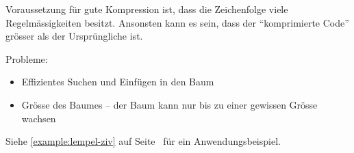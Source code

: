 Voraussetzung für gute Kompression ist, dass die Zeichenfolge viele
Regelmässigkeiten besitzt. Ansonsten kann es sein, dass der ``komprimierte
Code'' grösser als der Ursprüngliche ist.

Probleme:
\begin{itemize}
	\item Effizientes Suchen und Einfügen in den Baum
	\item Grösse des Baumes -- der Baum kann nur bis zu einer gewissen Grösse wachsen
\end{itemize}

Siehe \autoref{example:lempel-ziv} auf Seite~\pageref{example:lempel-ziv}
für ein Anwendungsbeispiel.
